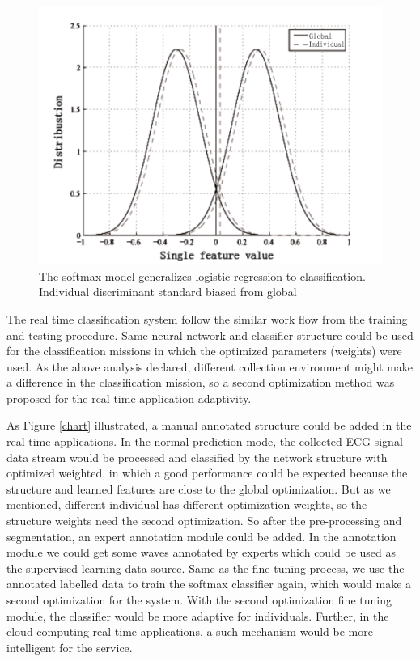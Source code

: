 \documentclass[journal]{IEEEtran}
\begin{document}
\begin{figure}[]
\centering
\includegraphics[width=3.2 in]{eps/bias.pdf}
\caption{The softmax model generalizes logistic regression to classification. Individual discriminant standard biased from global}
\label{bias}
\end{figure}

The real time classification system follow the similar work flow from the training and testing procedure. 
Same neural network and classifier structure could be used for the classification missions in which the optimized parameters (weights) were used. 
As the above analysis declared, different collection environment might make a difference in the classification mission, so a second optimization method was proposed for the real time application adaptivity. 

As Figure \ref{chart} illustrated, a manual annotated structure could be added in the real time applications.
In the normal prediction mode, the collected ECG signal data stream would be processed and classified by the network structure with optimized weighted, in which a good performance could be expected because the structure and learned features are close to the global optimization.
But as we mentioned, different individual has different optimization weights, so the structure weights need the second optimization. So after the pre-processing and segmentation, an expert annotation module could be added.
In the annotation module we could get some waves annotated by experts which could be used as the supervised learning data source.
Same as the fine-tuning process, we use the annotated labelled data to train the softmax classifier again, which would make a second optimization for the system.
With the second optimization fine tuning module, the classifier would be more adaptive for individuals. 
Further, in the cloud computing real time applications, a such mechanism would be more intelligent for the service.
\end{document}
